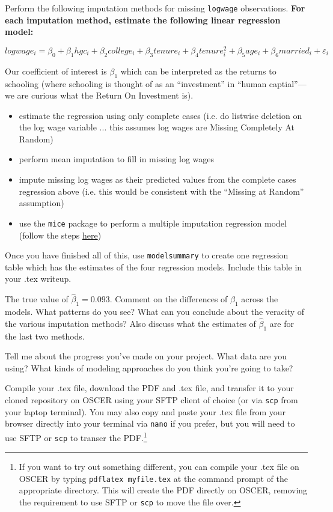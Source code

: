 \documentclass[12pt,english]{exam}
\begin{document}
\begin{questions}
\question Perform the following imputation methods for missing \texttt{logwage} observations. \textbf{For each imputation method, estimate the following linear regression model:}

\[
    logwage_{i} = \beta_{0} +  \beta_{1}hgc_{i} + \beta_{2}college_{i} + \beta_{3}tenure_{i} + \beta_{4}tenure^{2}_{i} + \beta_{5}age_{i} + \beta_{6}married_{i} + \varepsilon_{i}
\]

Our coefficient of interest is $\beta_{1}$ which can be interpreted as the returns to schooling (where schooling is thought of as an ``investment'' in ``human captial''---we are curious what the Return On Investment is).

\begin{itemize}
    \item estimate the regression using only complete cases (i.e. do listwise deletion on the log wage variable ... this assumes log wages are Missing Completely At Random)
    \item perform mean imputation to fill in missing log wages
    \item impute missing log wages as their predicted values from the complete cases regression above (i.e. this would be consistent with the ``Missing at Random'' assumption)
    \item use the \texttt{mice} package to perform a multiple imputation regression model (follow the steps \href{https://vincentarelbundock.github.io/modelsummary/articles/modelsummary.html#multiple-imputation}{here})
\end{itemize}

Once you have finished all of this, use \texttt{modelsummary} to create one regression table which has the estimates of the four regression models. Include this table in your .tex writeup. 

The true value of $\hat{\beta}_{1}=0.093$. Comment on the differences of $\hat{\beta}_{1}$ across the models. What patterns do you see? What can you conclude about the veracity of the various imputation methods? Also discuss what the estimates of $\hat{\beta}_{1}$ are for the last two methods.

\question Tell me about the progress you've made on your project. What data are you using? What kinds of modeling approaches do you think you're going to take?  

\question Compile your .tex file, download the PDF and .tex file, and transfer it to your cloned repository on OSCER using your SFTP client of choice (or via \texttt{scp} from your laptop terminal). You may also copy and paste your .tex file from your browser directly into your terminal via \texttt{nano} if you prefer, but you will need to use SFTP or \texttt{scp} to transer the PDF.\footnote{If you want to try out something different, you can compile your .tex file on OSCER by typing \texttt{pdflatex myfile.tex} at the command prompt of the appropriate directory. This will create the PDF directly on OSCER, removing the requirement to use SFTP or \texttt{scp} to move the file over.}


\end{questions}
\end{document}
